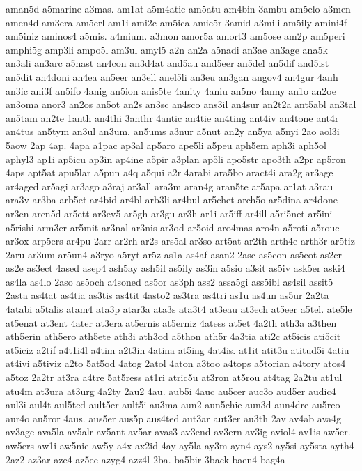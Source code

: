 {aman5d
a5marine
a3mas.
am1at
a5m4atic
am5atu
am4bin
3ambu
am5elo
a3men
amen4d
am3era
am5erl
am1i
ami2c
am5ica
amic5r
3amid
a3mili
am5ily
amini4f
am5iniz
aminos4
a5mis.
a4mium.
a3mon
amor5a
amort3
am5ose
am2p
am5peri
amphi5g
amp3li
ampo5l
am3ul
amyl5
a2n
an2a
a5nadi
an3ae
an3age
ana5k
an3ali
an3arc
a5nast
an4con
an3d4at
and5au
and5eer
an5del
an5dif
and5ist
an5dit
an4doni
an4ea
an5eer
an3ell
anel5li
an3eu
an3gan
angov4
an4gur
4anh
an3ic
ani3f
an5ifo
4anig
an5ion
anis5te
4anity
4aniu
an5no
4anny
an1o
an2oe
an3oma
anor3
an2os
an5ot
an2s
an3sc
an4sco
ans3il
an4sur
an2t2a
ant5abl
an3tal
an5tam
an2te
1anth
an4thi
3anthr
4antic
an4tie
an4ting
ant4iv
an4tone
ant4r
an4tus
an5tym
an3ul
an3um.
an5ums
a3nur
a5nut
an2y
an5ya
a5nyi
2ao
aol3i
5aow
2ap
4ap.
4apa
a1pac
ap3al
ap5aro
ape5li
a5peu
aph5em
aph3i
aph5ol
aphyl3
ap1i
ap5icu
ap3in
ap4ine
a5pir
a3plan
ap5li
apo5str
apo3th
a2pr
ap5ron
4aps
apt5at
apu5lar
a5pun
a4q
a5qui
a2r
4arabi
ara5bo
aract4i
ara2g
ar3age
ar4aged
ar5agi
ar3ago
a3raj
ar3all
ara3m
aran4g
aran5te
ar5apa
ar1at
a3rau
ara3v
ar3ba
arb5et
ar4bid
ar4bl
arb3li
ar4bul
ar5chet
arch5o
ar5dina
ar4done
ar3en
aren5d
ar5ett
ar3ev5
ar5gh
ar3gu
ar3h
ar1i
ar5iff
ar4ill
a5ri5net
ar5ini
a5rishi
arm3er
ar5mit
ar3nal
ar3nis
ar3od
ar5oid
aro4mas
aro4n
a5roti
a5rouc
ar3ox
arp5ers
ar4pu
2arr
ar2rh
ar2s
ars5al
ar3so
art5at
ar2th
arth4e
arth3r
ar5tiz
2aru
ar3um
ar5un4
a3ryo
a5ryt
ar5z
as1a
as4af
asan2
2asc
as5con
as5cot
as2cr
as2e
as3ect
4ased
asep4
ash5ay
ash5il
as5ily
as3in
a5sio
a3sit
as5iv
ask5er
aski4
as4la
as4lo
2aso
as5och
a4soned
as5or
as3ph
ass2
assa5gi
ass5ibl
as4sil
assit5
2asta
as4tat
as4tia
as3tis
as4tit
4asto2
as3tra
as4tri
as1u
as4un
as5ur
2a2ta
4atabi
a5talis
atam4
ata3p
atar3a
ata3s
ata3t4
at3eau
at3ech
at5eer
a5tel.
ate5le
at5enat
at3ent
4ater
at3era
at5ernis
at5erniz
4atess
at5et
4a2th
ath3a
a3then
ath5erin
ath5ero
ath5ete
ath3i
ath3od
a5thon
ath5r
4a3tia
ati2c
at5icis
ati5cit
at5iciz
a2tif
a4t1i4l
a4tim
a2t3in
4atina
at5ing
4at4is.
at1it
atit3u
atitud5i
4atiu
at4ivi
a5tiviz
a2to
5at5od
4atog
2atol
4aton
a3too
a4tops
a5torian
a4tory
atos4
a5toz
2a2tr
at3ra
a4tre
5at5ress
at1ri
atric5u
at3ron
at5rou
at4tag
2a2tu
at1ul
atu4m
at3ura
at3urg
4a2ty
2au2
4au.
aub5i
4auc
au5cer
auc3o
aud5er
audic4
aul3i
aul4t
aul5ted
ault5er
ault5i
au3ma
aun2
aun5chie
aun3d
aun4dre
au5reo
aur4o
au5ror
4aus.
aus5er
aus5p
aus4ted
aut3ar
aut3er
au3th
2av
av4ab
ava4g
av3age
ava5la
av5alr
av5ant
av5ar
avas3
av3end
av3ern
av3ig
aviol4
av1is
aw5er.
aw5ers
aw1i
aw5nie
aw5y
a4x
ax2id
4ay
ay5la
ay3m
ayn4
ays2
ay5si
ay5sta
ayth4
2az2
az3ar
aze4
az5ee
azyg4
azz4l
2ba.
ba5bir
3back
baen4
bag4a
}
